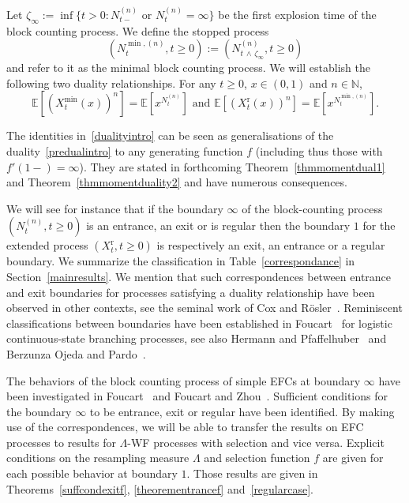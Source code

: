 \documentclass[10pt]{amsart}
\theoremstyle{definition}\newtheorem{defi}[theo]{Definition}\newtheorem{rema}[theo]{Remark}\newtheorem{exam}[theo]{Example}\newtheorem{exem}[theo]{Example}\newtheorem{nota}[theo]{Notation}
\newcommand{\rmr}{\mathrm{r}}
\newcommand{\bbN}{\mathbb{N}}
\newcommand{\bbE}{\mathbb{E}}
\begin{document}
Let $\zeta_\infty:=\inf\{t>0: N^{(n)}_{t-} \text{ or } N^{(n)}_{t}=\infty\}$ be the first explosion time of the block counting process. We define the stopped process 
\[
\left(N^{\min,(n)}_t,t\geq 0\right):= \left(N^{(n)}_{t\,\wedge\,\zeta_\infty},t\geq 0\right)
\]
and refer to it as the minimal block counting process. We will establish the following two duality relationships. For any $t\geq 0$, $x\in (0,1)$ and $n\in \bbN$,
\begin{equation}\label{dualityintro}
\bbE\left[\left(X^{\min}_t(x)\right)^n\right]=\bbE\left[x^{N^{(n)}_t}\right] \text{ and } \bbE\left[\left(X^{\rmr}_t(x)\right)^n\right]=\bbE\left[x^{N^{\min,(n)}_t}\right].
\end{equation}

The identities in~\eqref{dualityintro} can be seen as generalisations of the duality~\eqref{predualintro} to any generating function $f$ (including thus those with $f'(1-)=\infty$). They are stated in forthcoming Theorem~\ref{thmmomentdual1} and Theorem~\ref{thmmomentduality2} and have numerous consequences.

We will see for instance that if the boundary $\infty$ of the block-counting process $(N_t^{(n)},t\geq 0)$ is an entrance, an exit or is regular then the boundary $1$ for the extended process $(X_t^{\rmr},t\geq 0)$ is respectively an exit, an entrance or a regular boundary. We summarize the classification in Table~\ref{correspondance} in Section~\ref{mainresults}. We mention that such correspondences between entrance and exit boundaries for processes satisfying a duality relationship have been observed in other contexts, see the seminal work of Cox and R\"osler~\cite{zbMATH03828986}. Reminiscent classifications between boundaries have been established in Foucart~\cite{zbMATH07055671} for logistic continuous-state branching processes, see also Hermann and Pfaffelhuber~\cite{Hermann} and Berzunza Ojeda and Pardo~\cite{Berzunza}.

The behaviors of the block counting process of simple EFCs at boundary $\infty$ have been investigated in Foucart~\cite{cdiEFC} and Foucart and Zhou~\cite{explosion}. Sufficient conditions for the boundary $\infty$ to be entrance, exit or regular have been identified. By making use of the correspondences, we will be able to transfer the results on EFC processes to results for $\Lambda$-WF processes with selection and vice versa. Explicit conditions on the resampling measure $\Lambda$ and selection function $f$ are given for each possible behavior at boundary $1$. Those results are given in Theorems~\ref{suffcondexitf}, \ref{theorementrancef} and~\ref{regularcase}.
\end{document}
